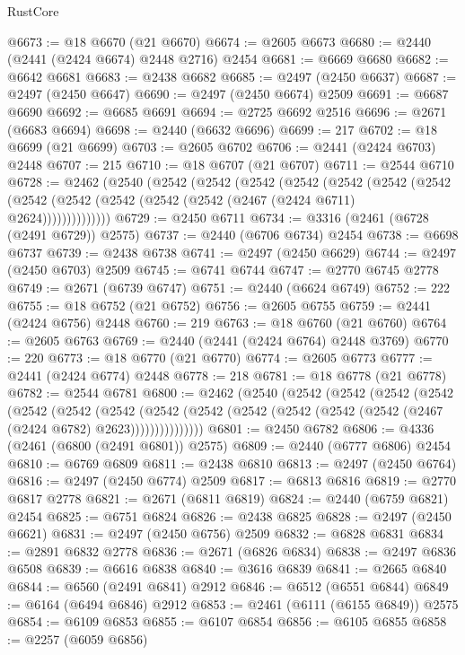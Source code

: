 \begin{lexlean}{RustCore}
\begin{coremodule}
@6673 := @18 @6670 (@21 @6670)
@6674 := @2605 @6673
@6680 := @2440 (@2441 (@2424 @6674) @2448 @2716) @2454
@6681 := @6669 @6680
@6682 := @6642 @6681
@6683 := @2438 @6682
@6685 := @2497 (@2450 @6637)
@6687 := @2497 (@2450 @6647)
@6690 := @2497 (@2450 @6674) @2509
@6691 := @6687 @6690
@6692 := @6685 @6691
@6694 := @2725 @6692 @2516
@6696 := @2671 (@6683 @6694)
@6698 := @2440 (@6632 @6696)
@6699 := 217
@6702 := @18 @6699 (@21 @6699)
@6703 := @2605 @6702
@6706 := @2441 (@2424 @6703) @2448
@6707 := 215
@6710 := @18 @6707 (@21 @6707)
@6711 := @2544 @6710
@6728 := @2462
    (@2540
      (@2542
        (@2542
          (@2542
            (@2542
              (@2542
                (@2542
                  (@2542 (@2542 (@2542 (@2542 (@2542 (@2542 (@2467 (@2424 @6711) @2624))))))))))))))
@6729 := @2450 @6711
@6734 := @3316 (@2461 (@6728 (@2491 @6729)) @2575)
@6737 := @2440 (@6706 @6734) @2454
@6738 := @6698 @6737
@6739 := @2438 @6738
@6741 := @2497 (@2450 @6629)
@6744 := @2497 (@2450 @6703) @2509
@6745 := @6741 @6744
@6747 := @2770 @6745 @2778
@6749 := @2671 (@6739 @6747)
@6751 := @2440 (@6624 @6749)
@6752 := 222
@6755 := @18 @6752 (@21 @6752)
@6756 := @2605 @6755
@6759 := @2441 (@2424 @6756) @2448
@6760 := 219
@6763 := @18 @6760 (@21 @6760)
@6764 := @2605 @6763
@6769 := @2440 (@2441 (@2424 @6764) @2448 @3769)
@6770 := 220
@6773 := @18 @6770 (@21 @6770)
@6774 := @2605 @6773
@6777 := @2441 (@2424 @6774) @2448
@6778 := 218
@6781 := @18 @6778 (@21 @6778)
@6782 := @2544 @6781
@6800 := @2462
    (@2540
      (@2542
        (@2542
          (@2542
            (@2542
              (@2542
                (@2542
                  (@2542
                    (@2542
                      (@2542 (@2542 (@2542 (@2542 (@2542 (@2467 (@2424 @6782) @2623)))))))))))))))
@6801 := @2450 @6782
@6806 := @4336 (@2461 (@6800 (@2491 @6801)) @2575)
@6809 := @2440 (@6777 @6806) @2454
@6810 := @6769 @6809
@6811 := @2438 @6810
@6813 := @2497 (@2450 @6764)
@6816 := @2497 (@2450 @6774) @2509
@6817 := @6813 @6816
@6819 := @2770 @6817 @2778
@6821 := @2671 (@6811 @6819)
@6824 := @2440 (@6759 @6821) @2454
@6825 := @6751 @6824
@6826 := @2438 @6825
@6828 := @2497 (@2450 @6621)
@6831 := @2497 (@2450 @6756) @2509
@6832 := @6828 @6831
@6834 := @2891 @6832 @2778
@6836 := @2671 (@6826 @6834)
@6838 := @2497 @6836 @6508
@6839 := @6616 @6838
@6840 := @3616 @6839
@6841 := @2665 @6840
@6844 := @6560 (@2491 @6841) @2912
@6846 := @6512 (@6551 @6844)
@6849 := @6164 (@6494 @6846) @2912
@6853 := @2461 (@6111 (@6155 @6849)) @2575
@6854 := @6109 @6853
@6855 := @6107 @6854
@6856 := @6105 @6855
@6858 := @2257 (@6059 @6856)

\end{coremodule}
\end{lexlean}
